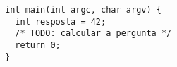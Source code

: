 \begin{verbatim}
int main(int argc, char argv) {
  int resposta = 42;
  /* TODO: calcular a pergunta */
  return 0;
}
\end{verbatim}
